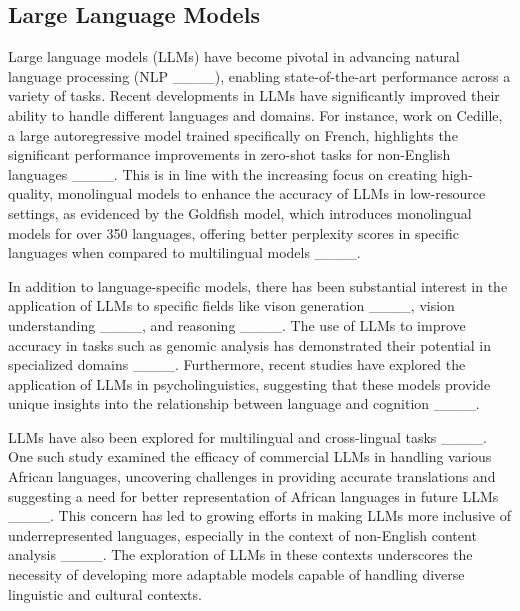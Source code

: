 \subsection{Large Language Models}

Large language models (LLMs) have become pivotal in advancing natural language processing (NLP ____), enabling state-of-the-art performance across a variety of tasks. Recent developments in LLMs have significantly improved their ability to handle different languages and domains. For instance, work on Cedille, a large autoregressive model trained specifically on French, highlights the significant performance improvements in zero-shot tasks for non-English languages ____. This is in line with the increasing focus on creating high-quality, monolingual models to enhance the accuracy of LLMs in low-resource settings, as evidenced by the Goldfish model, which introduces monolingual models for over 350 languages, offering better perplexity scores in specific languages when compared to multilingual models ____.

In addition to language-specific models, there has been substantial interest in the application of LLMs to specific fields like vison generation ____, vision understanding ____, and reasoning ____. The use of LLMs to improve accuracy in tasks such as genomic analysis has demonstrated their potential in specialized domains ____. Furthermore, recent studies have explored the application of LLMs in psycholinguistics, suggesting that these models provide unique insights into the relationship between language and cognition ____.

LLMs have also been explored for multilingual and cross-lingual tasks ____. One such study examined the efficacy of commercial LLMs in handling various African languages, uncovering challenges in providing accurate translations and suggesting a need for better representation of African languages in future LLMs ____. This concern has led to growing efforts in making LLMs more inclusive of underrepresented languages, especially in the context of non-English content analysis ____. The exploration of LLMs in these contexts underscores the necessity of developing more adaptable models capable of handling diverse linguistic and cultural contexts.